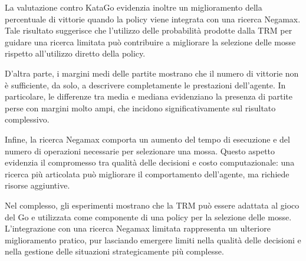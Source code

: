La valutazione contro KataGo evidenzia inoltre un miglioramento della percentuale di vittorie quando la policy viene integrata con una ricerca Negamax. Tale risultato suggerisce che l'utilizzo delle probabilità prodotte dalla TRM per guidare una ricerca limitata può contribuire a migliorare la selezione delle mosse rispetto all'utilizzo diretto della policy.

D'altra parte, i margini medi delle partite mostrano che il numero di vittorie non è sufficiente, da solo, a descrivere completamente le prestazioni dell'agente. In particolare, le differenze tra media e mediana evidenziano la presenza di partite perse con margini molto ampi, che incidono significativamente sul risultato complessivo.

Infine, la ricerca Negamax comporta un aumento del tempo di esecuzione e del numero di operazioni necessarie per selezionare una mossa. Questo aspetto evidenzia il compromesso tra qualità delle decisioni e costo computazionale: una ricerca più articolata può migliorare il comportamento dell'agente, ma richiede risorse aggiuntive.

Nel complesso, gli esperimenti mostrano che la TRM può essere adattata al gioco del Go e utilizzata come componente di una policy per la selezione delle mosse. L'integrazione con una ricerca Negamax limitata rappresenta un ulteriore miglioramento pratico, pur lasciando emergere limiti nella qualità delle decisioni e nella gestione delle situazioni strategicamente più complesse.
